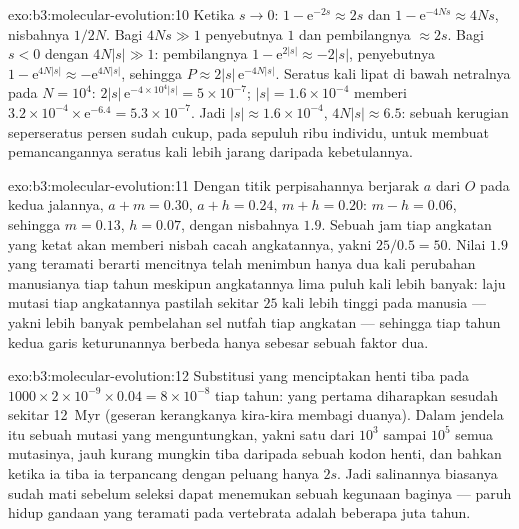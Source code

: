 \begin{solution}{exo:b3:molecular-evolution:10}
Ketika $s \to 0$: $1 - \mathrm{e}^{-2s} \approx 2s$ dan $1 - \mathrm{e}^{-4Ns}
\approx 4Ns$, nisbahnya $1/2N$. Bagi $4Ns \gg 1$ penyebutnya $1$ dan
pembilangnya $\approx 2s$. Bagi $s < 0$ dengan $4N|s| \gg 1$: pembilangnya $1 -
\mathrm{e}^{2|s|} \approx -2|s|$, penyebutnya $1 - \mathrm{e}^{4N|s|} \approx
-\mathrm{e}^{4N|s|}$, sehingga $P \approx 2|s|\,\mathrm{e}^{-4N|s|}$. Seratus kali lipat
di bawah netralnya pada $N = 10^{4}$: $2|s|\,\mathrm{e}^{-4\times 10^{4}|s|} =
5\times 10^{-7}$; $|s| = 1.6\times 10^{-4}$ memberi $3.2\times 10^{-4}\times
\mathrm{e}^{-6.4} = 5.3\times 10^{-7}$. Jadi $|s| \approx 1.6\times 10^{-4}$,
$4N|s| \approx 6.5$: sebuah kerugian seperseratus persen sudah
cukup, pada sepuluh ribu individu, untuk membuat pemancangannya seratus kali
lebih jarang daripada kebetulannya.
\end{solution}

\begin{solution}{exo:b3:molecular-evolution:11}
Dengan titik perpisahannya berjarak $a$ dari $O$ pada kedua jalannya, $a + m =
0.30$, $a + h = 0.24$, $m + h = 0.20$: $m - h = 0.06$, sehingga $m = 0.13$, $h
= 0.07$, dengan nisbahnya $1.9$. Sebuah jam tiap angkatan yang ketat akan memberi
nisbah cacah angkatannya, yakni $25/0.5 = 50$. Nilai $1.9$ yang teramati berarti
mencitnya telah menimbun hanya dua kali perubahan manusianya tiap tahun meskipun
angkatannya lima puluh kali lebih banyak: laju mutasi tiap angkatannya pastilah
sekitar $25$ kali lebih tinggi pada manusia --- yakni lebih banyak pembelahan sel nutfah tiap
angkatan --- sehingga tiap tahun kedua garis keturunannya berbeda hanya sebesar sebuah faktor
dua.
\end{solution}

\begin{solution}{exo:b3:molecular-evolution:12}
Substitusi yang menciptakan henti tiba pada $1000\times 2\times 10^{-9}\times
0.04 = 8\times 10^{-8}$ tiap tahun: yang pertama diharapkan sesudah sekitar
\qty{12}{Myr} (geseran kerangkanya kira-kira membagi duanya). Dalam jendela itu sebuah
mutasi yang menguntungkan, yakni satu dari $10^{3}$ sampai $10^{5}$ semua mutasinya, jauh
kurang mungkin tiba daripada sebuah kodon henti, dan bahkan ketika ia tiba ia
terpancang dengan peluang hanya $2s$. Jadi salinannya biasanya sudah mati sebelum
seleksi dapat menemukan sebuah kegunaan baginya --- paruh hidup gandaan yang teramati pada
vertebrata adalah beberapa juta tahun.
\end{solution}

